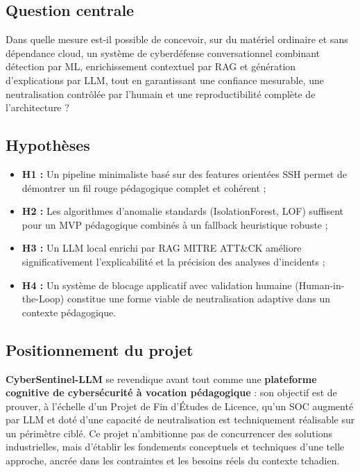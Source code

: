 \documentclass[12pt,a4paper]{report}
\begin{document}
\subsection*{Question centrale}
\begin{onehalfspace}
Dans quelle mesure est-il possible de concevoir, sur du matériel ordinaire
et sans dépendance cloud, un système de cyberdéfense conversationnel combinant
détection par ML, enrichissement contextuel par RAG et génération d'explications
par LLM, tout en garantissant une confiance mesurable, une neutralisation
contrôlée par l'humain et une reproductibilité complète de l'architecture ?
\end{onehalfspace}

\subsection*{Hypothèses}
\begin{onehalfspace}
\begin{itemize}
  \item[\ding{43}] \textbf{H1 :} Un pipeline minimaliste basé sur des features
  orientées SSH permet de démontrer un fil rouge pédagogique complet et cohérent ;
  \item[\ding{43}] \textbf{H2 :} Les algorithmes d'anomalie standards
  (IsolationForest, LOF) suffisent pour un MVP pédagogique combinés à un
  fallback heuristique robuste ;
  \item[\ding{43}] \textbf{H3 :} Un LLM local enrichi par RAG MITRE ATT\&CK
  améliore significativement l'explicabilité et la précision des analyses
  d'incidents ;
  \item[\ding{43}] \textbf{H4 :} Un système de blocage applicatif avec
  validation humaine (Human-in-the-Loop) constitue une forme viable de
  neutralisation adaptive dans un contexte pédagogique.
\end{itemize}
\end{onehalfspace}

\subsection*{Positionnement du projet}
\begin{onehalfspace}
\textbf{CyberSentinel-LLM} se revendique avant tout comme une
\textbf{plateforme cognitive de cybersécurité à vocation pédagogique} : son
objectif est de prouver, à l'échelle d'un Projet de Fin d'Études de Licence,
qu'un SOC augmenté par LLM et doté d'une capacité de neutralisation est
techniquement réalisable sur un périmètre ciblé. Ce projet n'ambitionne pas
de concurrencer des solutions industrielles, mais d'établir les fondements
conceptuels et techniques d'une telle approche, ancrée dans les contraintes
et les besoins réels du contexte tchadien.
\end{onehalfspace}
\end{document}
